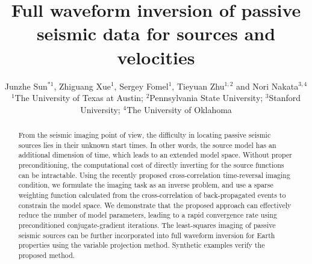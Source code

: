 
\title{Full waveform inversion of passive seismic data for sources and velocities}

\author{Junzhe Sun$^{*1}$, Zhiguang Xue$^1$, Sergey Fomel$^{1}$, Tieyuan Zhu$^{1,2}$ and Nori Nakata$^{3,4}$
\\
$^1$The University of Texas at Austin; $^2$Pennsylvania State University; $^3$Stanford University; $^4$The University of Oklahoma}

\maketitle


\begin{abstract}
From the seismic imaging point of view, the difficulty in locating passive seismic sources lies in their unknown start times. In other words, the source model has an additional dimension of time, which leads to an extended model space. Without proper preconditioning, the computational cost of directly inverting for the source functions can be intractable. Using the recently proposed cross-correlation time-reversal imaging condition, we formulate the imaging task as an inverse problem, and use a sparse weighting function calculated from the cross-correlation of back-propagated events to constrain the model space. We demonstrate that the proposed approach can effectively reduce the number of model parameters, leading to a rapid convergence rate using preconditioned conjugate-gradient iterations. The least-squares imaging of passive seismic sources can be further incorporated into full waveform inversion for Earth properties using the variable projection method. Synthetic examples verify the proposed method.
\end{abstract}

